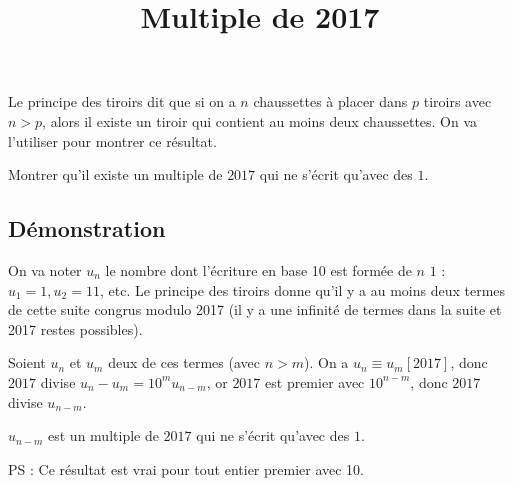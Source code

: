 \documentclass[fontsize=12pt,twoside=false,parskip=half, french]{scrartcl}
\title{Multiple de 2017}
\date{}
\author{}
\begin{document}
\maketitle
   Le principe des tiroirs dit que si on a $n$ chaussettes à placer dans $p$ tiroirs avec $n > p$, 
   alors il existe un tiroir qui contient au moins deux chaussettes. On va l’utiliser pour montrer ce résultat.
   \begin{Theoreme}
      Montrer qu’il existe un multiple de $2017$ qui ne s’écrit qu’avec des $1$.
   \end{Theoreme}
   \subsection{Démonstration}
      On va noter $u_n$ le nombre dont l’écriture en base 10 est formée de $n$ $1$ : $u_1 = 1,u_2 = 11$, etc.
      Le principe des tiroirs donne qu’il y a au moins deux termes de cette suite congrus modulo 2017 (il y a une 
      infinité de termes dans la suite et 2017 restes possibles).
      
      Soient $u_n$ et $u_m$ deux de ces termes (avec $n > m$). 
      On a $u_n \equiv u_m[2017]$, donc $2017$ divise $u_n - u_m = 10^mu_{n - m}$, or $2017$ est premier avec 
      $10^{n - m}$, donc $2017$ divise $u_{n - m}$.
      
      $u_{n - m}$ est un multiple de $2017$ qui ne s’écrit qu’avec des $1$.
      
      PS : Ce résultat est vrai pour tout entier premier avec 10.
\end{document}

